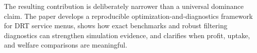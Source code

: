 The resulting contribution is deliberately narrower than a universal dominance claim. The paper develops a reproducible optimization-and-diagnostics framework for DRT service menus, shows how exact benchmarks and robust filtering diagnostics can strengthen simulation evidence, and clarifies when profit, uptake, and welfare comparisons are meaningful.
